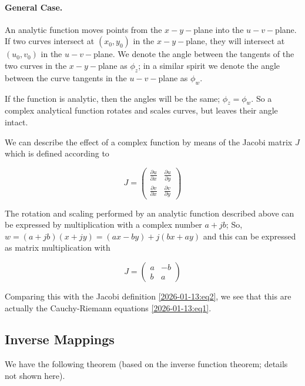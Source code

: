 \paragraph{General Case.} An analytic function moves points from the $x-y-$plane into the $u-v-$plane. If two curves intersect at $(x_0, y_0)$ in the $x-y-$plane, they will intersect at $(u_0, v_0)$ in the $u-v-$plane. We denote the angle between the tangents of the two curves in the $x-y-$plane as $\phi_z$; in a similar spirit we denote the angle between the curve tangents in the $u-v-$plane as $\phi_w$.

If the function is analytic, then the angles will be the same; $\phi_z = \phi_w$. So a complex analytical function rotates and scales curves, but leaves their angle intact.

We can describe the effect of a complex function by means of the Jacobi matrix $J$ which is defined according to

\begin{equation}\label{2026-01-13:eq2}
	J = \begin{pmatrix} \frac{\partial u}{\partial x} & \frac{\partial u}{\partial y} \\ \frac{\partial v}{\partial x} & \frac{\partial v}{\partial y} \end{pmatrix}
\end{equation}

The rotation and scaling performed by an analytic function described above can be expressed by multiplication with a complex number $a+jb$; So, $w = (a+jb)(x+jy) = (ax-by) + j(bx+ay)$ and this can be expressed as matrix multiplication with

\begin{equation*}
	J = \begin{pmatrix} a & -b \\ b & a \end{pmatrix}
\end{equation*}

Comparing this with the Jacobi definition \eqref{2026-01-13:eq2}, we see that this are actually the Cauchy-Riemann equations \eqref{2026-01-13:eq1}.


\subsection{Inverse Mappings}

We have the following theorem (based on the inverse function theorem; details not shown here).

